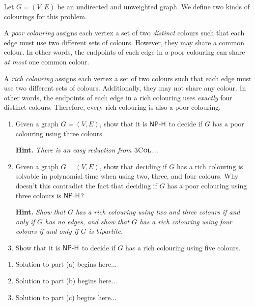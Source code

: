 \documentclass{article}
\begin{document}
\begin{question}
Let $G = (V, E)$ be an undirected and unweighted graph. We define two kinds of colourings for this problem.

A {\em poor colouring} assigns each vertex a set of two {\em distinct} colours such that each edge must use two different sets of colours. However, they may share a common colour. In other words, the endpoints of each edge in a poor colouring can share {\em at most} one common colour.

A {\em rich colouring} assigns each vertex a set of two colours such that each edge must use two different sets of colours. Additionally, they may not share any colour. In other words, the endpoints of each edge in a rich colouring uses {\em exactly} four distinct colours. Therefore, every rich colouring is also a poor colouring.

\begin{enumerate}[label = (\alph*)]
    \item Given a graph $G = (V, E)$, show that it is $\mathsf{NP\text-H}$ to decide if $G$ has a poor colouring using three colours.

    {\bfseries Hint.} {\em There is an easy reduction from $\mathsf{\textsc{3Col}}$...}

    \item Given a graph $G = (V, E)$, show that deciding if $G$ has a rich colouring is solvable in polynomial time when using two, three, and four colours. Why doesn't this contradict the fact that deciding if $G$ has a poor colouring using three colours is $\mathsf{NP\text-H}$?

    {\bfseries Hint.} {\em Show that $G$ has a rich colouring using two and three colours if and only if $G$ has no edges, and show that $G$ has a rich colouring using four colours if and only if $G$ is bipartite.}

    \item Show that it is $\mathsf{NP\text-H}$ to decide if $G$ has a rich colouring using five colours.
\end{enumerate}
\end{question}

\begin{solution}
\begin{enumerate}[label = (\alph*)]
    \item Solution to part (a) begins here...

    \item Solution to part (b) begins here...

    \item Solution to part (c) begins here...
\end{enumerate}
\end{solution}
\end{document}

